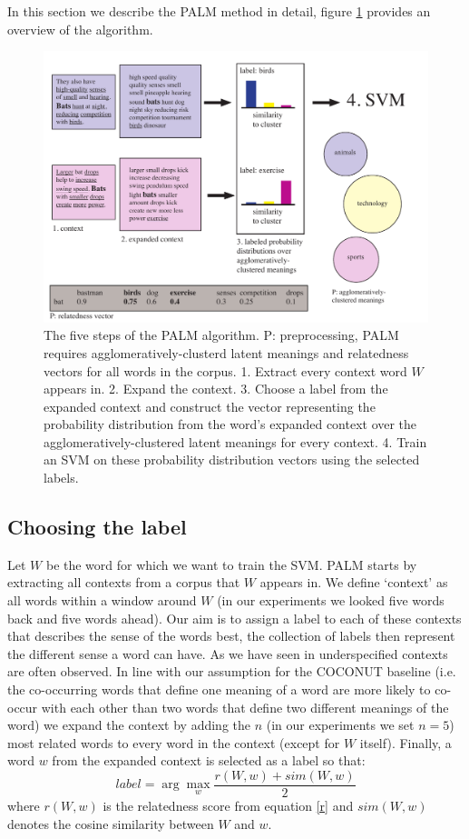 \documentclass[11pt]{article}
\begin{document}
In this section we describe the PALM method in detail, figure \ref{palmimg} provides an overview of the algorithm. 
\begin{figure}
\center
\includegraphics[scale=0.6]{images/palm.pdf}
\caption{The five steps of the PALM algorithm. P: preprocessing, PALM requires agglomeratively-clusterd latent meanings and relatedness vectors for all words in the corpus. 1. Extract every context word $W$ appears in. 2. Expand the context. 3. Choose a label from the expanded context and construct the vector representing the probability distribution from the word's expanded context over the agglomeratively-clustered latent meanings for every context. 4. Train an SVM on these probability distribution vectors using the selected labels.}
\label{palmimg}
\end{figure}

\subsection{Choosing the label}
Let $W$ be the word for which we want to train the SVM. PALM starts by extracting all contexts from a corpus that $W$ appears in. We define `context' as all words within a window around $W$ (in our experiments we looked five words back and five words ahead). Our aim is to assign a label to each of these contexts that describes the sense of the words best, the collection of labels then represent the different sense a word can have. As we have seen in \cite{analysis} underspecified contexts are often observed. In line with our assumption for the COCONUT baseline (i.e. the co-occurring words that define one meaning of a word are more likely to co-occur with each other than two words that define two different meanings of the word) we expand the context by adding the $n$ (in our experiments we set $n=5$) most related words to every word in the context (except for $W$ itself). Finally, a word $w$ from the expanded context is selected as a label so that:
\begin{equation}\label{label}label = \arg\max_w \frac{r(W, w) + \textit{sim}(W, w)}{2}\end{equation}
where $r(W, w)$ is the relatedness score from equation \ref{r} and $\textit{sim}(W, w)$ denotes the cosine similarity between $W$ and $w$. 
\end{document}
